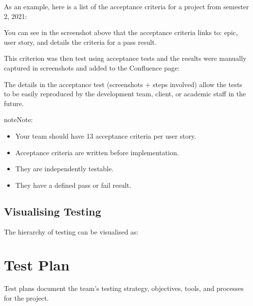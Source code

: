 \documentclass[letterpaper,10pt,english]{jupyterBook}
\begin{document}
\sphinxAtStartPar
As an example, here is a list of the acceptance criteria for a project
from semester 2, 2021:

\sphinxAtStartPar
{}

\sphinxAtStartPar
You can see in the screenshot above that the acceptance criteria links
to: epic, user story, and details the criteria for a pass result.

\sphinxAtStartPar
This criterion was then test using acceptance tests and the results were
manually captured in screenshots and added to the Confluence page:

\sphinxAtStartPar
{}

\sphinxAtStartPar
The details in the acceptance test (screenshots + steps involved) allow
the tests to be easily reproduced by the development team, client, or
academic staff in the future.

\begin{sphinxadmonition}{note}{Note:}\begin{itemize}
\item {} 
\sphinxAtStartPar
Your team should have 1\sphinxhyphen{}3 acceptance criteria per user story.

\item {} 
\sphinxAtStartPar
Acceptance criteria are written before implementation.

\item {} 
\sphinxAtStartPar
They are independently testable.

\item {} 
\sphinxAtStartPar
They have a defined pass or fail result.

\end{itemize}
\end{sphinxadmonition}


\subsection{Visualising Testing}
\label{\detokenize{chapter_13/testing:visualising-testing}}
\sphinxAtStartPar
The hierarchy of testing can be visualised as:

\sphinxAtStartPar
{}


\section{Test Plan}
\label{\detokenize{chapter_13/testing:test-plan}}
\sphinxAtStartPar
Test plans document the team’s testing strategy, objectives, tools, and
processes for the project.
\end{document}
